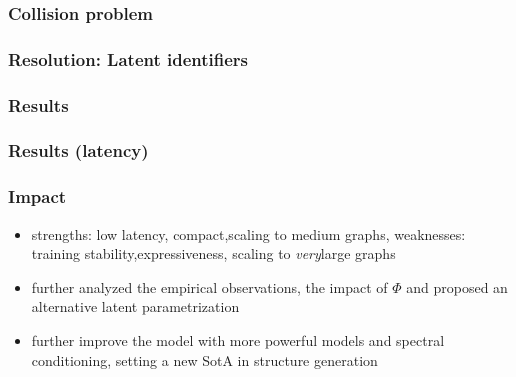 \documentclass[./presentation.tex]{subfiles}
\begin{document}

\begin{frame}[label=working,t]
  \frametitle{Collision problem}
  
\end{frame}
\begin{frame}[label=working,t]
  \frametitle{Resolution: Latent identifiers}
  
\end{frame}
\begin{frame}[label=working,t]
  \frametitle{Results}
  
\end{frame}
\begin{frame}[label=working,t]
  \frametitle{Results (latency)}
  
\end{frame}


\begin{frame}[label=working,t]
  \frametitle{Impact}
  \begin{itemize}
    \item strengths: low latency\checkmark, compact\checkmark,scaling to medium graphs\checkmark, weaknesses: training stability,expressiveness, scaling to \emph{very}large graphs
    \item \citep{vignacTopNEquivariantSet2021d} further analyzed the empirical observations, the impact of $\Phi$ and proposed an alternative latent parametrization
    \item \citep{martinkusSPECTRESpectralConditioning2022b} further improve the model with more powerful models and spectral conditioning, setting a new SotA in structure generation
  \end{itemize}
\end{frame}
\end{document}

